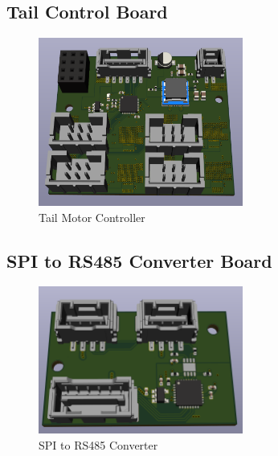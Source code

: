 \subsection{Tail Control Board}
\begin{figure}[H]
       \centering
       \includegraphics[width=0.6\textwidth]{figures/TailControllerBoard.png}
       \caption{Tail Motor Controller}
       \label{fig:TailControlBoardPCB}
   \end{figure}
   
\subsection{SPI to RS485 Converter Board}
\begin{figure}[H]
       \centering
       \includegraphics[width=0.6\textwidth]{figures/ConverterBoard.png}
       \caption{SPI to RS485 Converter}
       \label{fig:SPItoRS485ConverterPCB}
   \end{figure}
